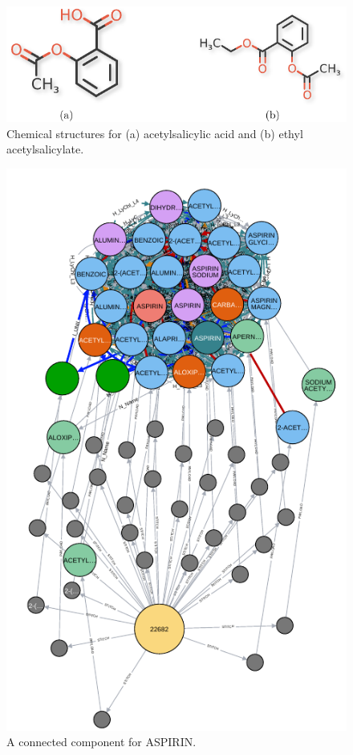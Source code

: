 \documentclass{bmcart}
\begin{document}
\begin{backmatter}
\begin{figure}[!ht]
  \caption{Chemical structures for (a) acetylsalicylic acid and (b) ethyl
    acetylsalicylate.}\label{fig:aspirin} 
  \centerline{\includegraphics[scale=0.7]{aspirin-fig-crop}}
\end{figure}

\begin{figure}[ht!]
  \caption{A connected component for ASPIRIN.}\label{fig:ASPIRIN}
  \centerline{\includegraphics[scale=0.5]{graph5-crop}}
\end{figure}


\end{backmatter}
\end{document}
